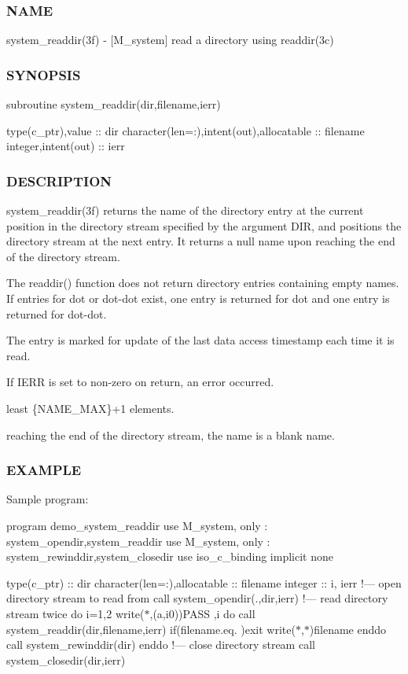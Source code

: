 \subsubsection*{N\+A\+ME}

system\+\_\+readdir(3f) -\/ \mbox{[}M\+\_\+system\mbox{]} read a directory using readdir(3c) \subsubsection*{S\+Y\+N\+O\+P\+S\+IS}

subroutine system\+\_\+readdir(dir,filename,ierr)

type(c\+\_\+ptr),value \+:\+: dir character(len=\+:),intent(out),allocatable \+:\+: filename integer,intent(out) \+:\+: ierr

\subsubsection*{D\+E\+S\+C\+R\+I\+P\+T\+I\+ON}

system\+\_\+readdir(3f) returns the name of the directory entry at the current position in the directory stream specified by the argument D\+IR, and positions the directory stream at the next entry. It returns a null name upon reaching the end of the directory stream.

The readdir() function does not return directory entries containing empty names. If entries for dot or dot-\/dot exist, one entry is returned for dot and one entry is returned for dot-\/dot.

The entry is marked for update of the last data access timestamp each time it is read.

If I\+E\+RR is set to non-\/zero on return, an error occurred.

least \{N\+A\+M\+E\+\_\+\+M\+AX\}+1 elements.

reaching the end of the directory stream, the name is a blank name.

\subsubsection*{E\+X\+A\+M\+P\+LE}

Sample program\+:

program demo\+\_\+system\+\_\+readdir use M\+\_\+system, only \+: system\+\_\+opendir,system\+\_\+readdir use M\+\_\+system, only \+: system\+\_\+rewinddir,system\+\_\+closedir use iso\+\_\+c\+\_\+binding implicit none

type(c\+\_\+ptr) \+:\+: dir character(len=\+:),allocatable \+:\+: filename integer \+:\+: i, ierr !--- open directory stream to read from call system\+\_\+opendir(\textquotesingle{}.\textquotesingle{},dir,ierr) !--- read directory stream twice do i=1,2 write($\ast$,\textquotesingle{}(a,i0)\textquotesingle{})\textquotesingle{}P\+A\+SS \textquotesingle{},i do call system\+\_\+readdir(dir,filename,ierr) if(filename.\+eq.\textquotesingle{} \textquotesingle{})exit write($\ast$,$\ast$)filename enddo call system\+\_\+rewinddir(dir) enddo !--- close directory stream call system\+\_\+closedir(dir,ierr)

